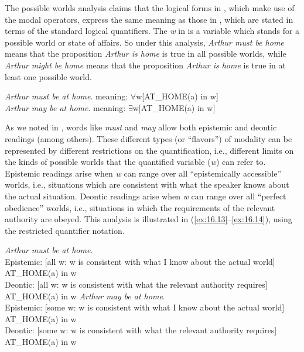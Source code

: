 The possible worlds analysis claims that the logical forms in , which make use of the modal operators, express the same meaning as those in , which are stated in terms of the standard logical quantifiers. The \textit{w} in  is a variable which stands for a possible world or state of affairs. So under this analysis, \textit{Arthur must be home} means that the proposition \textit{Arthur is home} is true in all possible worlds, while \textit{Arthur might be home} means that the proposition \textit{Arthur is home} is true in at least one possible world.


\ea \label{ex:16.12}
\ea  \textit{Arthur must be at home}. \hfill meaning: ${\forall}$w[AT\_HOME(a) in w]\\
\ex \textit{Arthur may be at home}.                 \hfill meaning: ${\exists}$w[AT\_HOME(a) in w]
                       \z
\z


As we noted in , words like \textit{must} and \textit{may} allow both epistemic and deontic readings (among others). These different types (or “flavors”) of modality can be represented by different restrictions on the quantification, i.e., different limits on the kinds of possible worlds that the quantified variable (\textit{w}) can refer to. Epistemic readings arise when \textit{w} can range over all “epistemically accessible” worlds, i.e., situations which are consistent with what the speaker knows about the actual situation. Deontic readings arise when \textit{w} can range over all “perfect obedience” worlds, i.e., situations in which the requirements of the relevant authority are obeyed. This analysis is illustrated in (\ref{ex:16.13}--\ref{ex:16.14}), using the restricted quantifier notation.


\ea \label{ex:16.13}
\textit{Arthur must be at home}.\\
  \ea Epistemic: {}[all w: w is consistent with what I know about the actual world] AT\_HOME(a) in w\\
  \ex Deontic: {}[all w: w is consistent with what the relevant authority requires] AT\_HOME(a) in w
  \z
\ex \label{ex:16.14}
\textit{Arthur may be at home}.\\
  \ea Epistemic: {}[some w: w is consistent with what I know about the actual world] AT\_HOME(a) in w\\
  \ex Deontic: {}[some w: w is consistent with what the relevant authority requires] AT\_HOME(a) in w
  \z
\z


